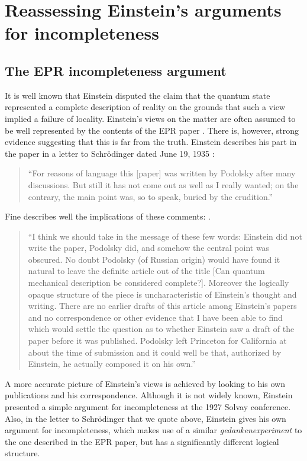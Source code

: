 \documentclass[aps,nofootinbib,12pt]{revtex4-2}
\begin{document}
\section{Reassessing Einstein's arguments for incompleteness \label{SEC:historical}}

\subsection{The EPR incompleteness argument}

It is well known that Einstein disputed the claim that the quantum
state represented a complete description of reality on the grounds
that such a view implied a failure of locality. Einstein's views on
the matter are often assumed to be well represented by the contents
of the EPR paper \cite{EPR}. There is, however, strong evidence
suggesting that this is far from the truth. Einstein describes his
part in the paper in a letter to Schr\"{o}dinger dated June 19, 1935
\cite{EtoS1935}:
\begin{quote}
``For reasons of language this [paper] was written by Podolsky after
many discussions. But still it has not come out as well as I really
wanted; on the contrary, the main point was, so to speak, buried by
the erudition.''
\end{quote}
Fine describes well the implications of these comments:
\cite{FineEcritique}.
\begin{quote}
``I think we should take in the message of these few words: Einstein did not
write the paper, Podolsky did, and somehow the central point was obscured. No
doubt Podolsky (of Russian origin) would have found it natural to leave the
definite article out of the title [Can quantum mechanical description be
considered complete?]. Moreover the logically opaque structure of the piece is
uncharacteristic of Einstein's thought and writing. There are no earlier
drafts of this article among Einstein's papers and no correspondence or other
evidence that I have been able to find which would settle the question as to
whether Einstein saw a draft of the paper before it was published. Podolsky
left Princeton for California at about the time of submission and it could
well be that, authorized by Einstein, he actually composed it on his own.''
\end{quote}

A more accurate picture of Einstein's views is achieved by looking
to his own publications and his correspondence. Although it is not
widely known, Einstein presented a simple argument for
incompleteness at the 1927 Solvay conference. Also, in the letter to
Schr\"{o}dinger that we quote above, Einstein gives his own argument
for incompleteness, which makes use of a similar
\textit{gedankenexperiment} to the one described in the EPR paper,
but has a significantly different logical structure.
\end{document}
